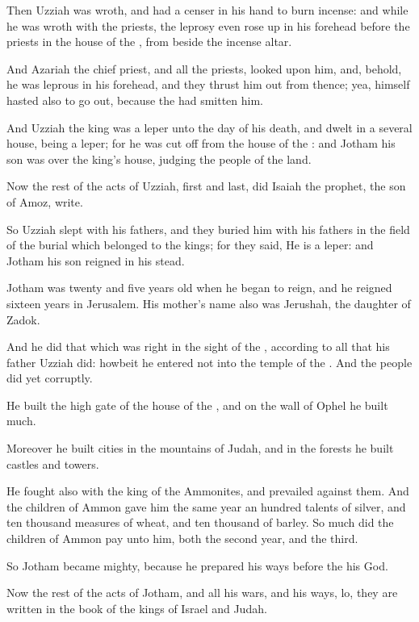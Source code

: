\Verse Then Uzziah was wroth, and had a censer in his hand to burn incense: and while he was wroth with the priests, the leprosy even rose up in his forehead before the priests in the house of the \LORD, from beside the incense altar.

\Verse And Azariah the chief priest, and all the priests, looked upon him, and, behold, he was leprous in his forehead, and they thrust him out from thence; yea, himself hasted also to go out, because the \LORD had smitten him.

\Verse And Uzziah the king was a leper unto the day of his death, and dwelt in a several house, being a leper; for he was cut off from the house of the \LORD: and Jotham his son was over the king's house, judging the people of the land.

\Verse Now the rest of the acts of Uzziah, first and last, did Isaiah the prophet, the son of Amoz, write.

\Verse So Uzziah slept with his fathers, and they buried him with his fathers in the field of the burial which belonged to the kings; for they said, He is a leper: and Jotham his son reigned in his stead.


\Chapter
\Verse Jotham was twenty and five years old when he began to reign, and he reigned sixteen years in Jerusalem. His mother's name also was Jerushah, the daughter of Zadok.

\Verse And he did that which was right in the sight of the \LORD, according to all that his father Uzziah did: howbeit he entered not into the temple of the \LORD. And the people did yet corruptly.

\Verse He built the high gate of the house of the \LORD, and on the wall of Ophel he built much.

\Verse Moreover he built cities in the mountains of Judah, and in the forests he built castles and towers.

\Verse He fought also with the king of the Ammonites, and prevailed against them. And the children of Ammon gave him the same year an hundred talents of silver, and ten thousand measures of wheat, and ten thousand of barley. So much did the children of Ammon pay unto him, both the second year, and the third.

\Verse So Jotham became mighty, because he prepared his ways before the \LORD his God.

\Verse Now the rest of the acts of Jotham, and all his wars, and his ways, lo, they are written in the book of the kings of Israel and Judah.

